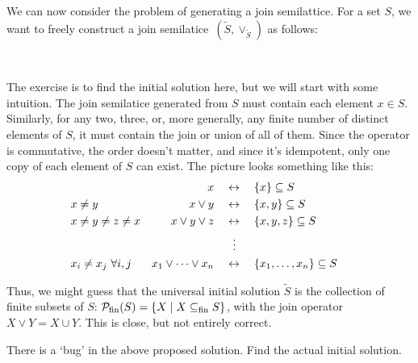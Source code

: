 We can now consider the problem of generating a join semilattice.  For a set
$S$, we want to freely construct a join
semilatice~$(\widetilde S,\vee_{\widetilde S})$ as follows:
\begin{center}
    \\[2mm]
\end{center}
The exercise is to find the initial solution here, but we will start with some
intuition. The join semilatice generated from $S$ must contain each element
$x\in S$. Similarly, for any two, three, or, more generally, any finite
number of distinct elements of $S$, it must contain the join or union of all
of them.  Since the operator is commutative, the order doesn't matter, and
since it's idempotent, only one copy of each element of $S$ can exist. The
picture looks something like this:
\begin{align*}
&
&
x  & \quad\leftrightarrow\quad \{ x \} \subseteq S
\\
& x\not= y
& x \lor y & \quad\leftrightarrow\quad \{ x,y \} \subseteq S
\\
& x\not= y \not= z \not= x
&
x \lor y \lor z & \quad\leftrightarrow\quad \{ x,y,z \} \subseteq S
\\
& &
& \,\enspace\quad\vdots &
\\
&
x_i \not= x_j\ \forall i,j
& x_1 \lor \cdots \lor x_n & \quad\leftrightarrow\quad \{ x_1, \ldots, x_n \}
\subseteq S
\end{align*}

Thus, we might guess that the universal initial solution $\widetilde{S}$ is
the collection of finite subsets of $S$: $\mathcal{P}_{\mathrm{fin}}(S) =
\{ X \mid
X \subseteq_\mathrm{fin} S \}$, with the join operator $X \lor Y = X \cup Y$.
This is close, but not entirely correct.

\begin{exercise}
There is a `bug' in the above proposed solution. Find the actual initial
solution.\label{ex:bug}
\end{exercise}


